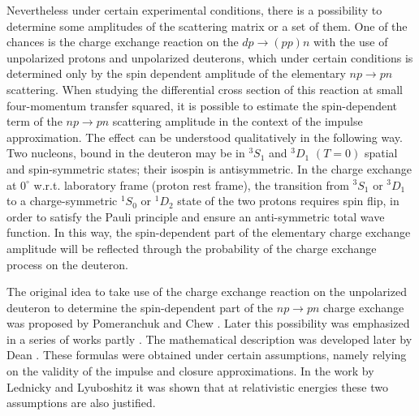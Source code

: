 \documentclass[twocolumn,epjc3]{svjour3}
\newcommand{\np}     {\ensuremath{np \rightarrow pn}\xspace}
\newcommand{\dpchex} {\ensuremath{dp \rightarrow (pp)n}\xspace}
\begin{document}
Nevertheless under certain experimental conditions, there is a possibility to
determine some amplitudes of the scattering matrix or a set of them. One of the
chances is the charge exchange reaction on the \dpchex with the use of
unpolarized protons and unpolarized deuterons, which under certain conditions is
determined only by the spin dependent amplitude of the elementary \np
scattering. When studying the differential cross section of this reaction at
small four-momentum transfer squared, it is possible to estimate the
spin-dependent term of the \np scattering amplitude in the context of the
impulse approximation. The effect can be understood qualitatively in the
following way. Two nucleons, bound in the deuteron may be in $^3S_1$ and $^3D_1$
$(T = 0)$ spatial and spin-symmetric states; their isospin is antisymmetric. In
the charge exchange at $0^\circ$ w.r.t. laboratory frame (proton rest frame),
the transition from $^3S_1$ or $^3D_1$ to a charge-symmetric $^1S_0$ or $^1D_2$
state of the two protons requires spin flip, in order to satisfy the Pauli
principle and ensure an anti-symmetric total wave function. In this way, the
spin-dependent part of the elementary charge exchange amplitude will be
reflected through the probability of the charge exchange process on the
deuteron.

The original idea to take use of the charge exchange reaction on the unpolarized
deuteron to determine the spin-dependent part of the \np charge exchange was
proposed by Pomeranchuk \cite{pom51} and Chew \cite{chew51}. Later this
possibility was emphasized in a series of works partly
\cite{mig55,pom51_2,lap57,dea72,dea72_2,ala75,ala75_2,bug87}. The mathematical
description was developed later by Dean \cite{dea72,dea72_2}. These formulas
were obtained under certain assumptions, namely relying on the validity of the
impulse and closure approximations. In the work by Lednicky and Lyuboshitz
\cite{led04} it was shown that at relativistic energies these two assumptions
are also justified.
\end{document}
